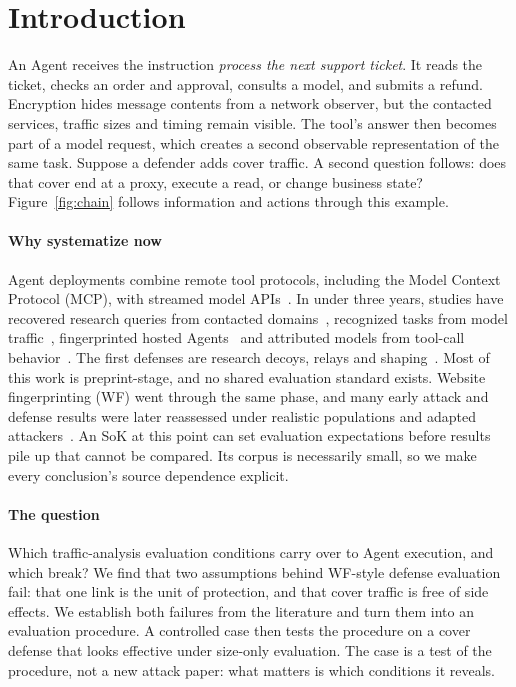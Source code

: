 \section{Introduction}
An Agent receives the instruction \emph{process the next support ticket}. It reads the ticket, checks an order and approval, consults a model, and submits a refund. Encryption hides message contents from a network observer, but the contacted services, traffic sizes and timing remain visible. The tool's answer then becomes part of a model request, which creates a second observable representation of the same task. Suppose a defender adds cover traffic. A second question follows: does that cover end at a proxy, execute a read, or change business state? Figure~\ref{fig:chain} follows information and actions through this example.



\paragraph{Why systematize now}
Agent deployments combine remote tool protocols, including the Model Context Protocol (MCP), with streamed model APIs~\cite{mcp2025transports,rfc9113}. In under three years, studies have recovered research queries from contacted domains~\cite{jeong2026wra}, recognized tasks from model traffic~\cite{li2026ant,pouryousef2026traffic}, fingerprinted hosted Agents~\cite{agentprint2025} and attributed models from tool-call behavior~\cite{zhao2026agenttrace,ediga2026trace}. The first defenses are research decoys, relays and shaping~\cite{jeong2026wra,dangol2026workflow}. Most of this work is preprint-stage, and no shared evaluation standard exists. Website fingerprinting (WF) went through the same phase, and many early attack and defense results were later reassessed under realistic populations and adapted attackers~\cite{dyer2012peekaboo,juarez2014critical,mathews2023critical}. An SoK at this point can set evaluation expectations before results pile up that cannot be compared. Its corpus is necessarily small, so we make every conclusion's source dependence explicit.

\paragraph{The question}
Which traffic-analysis evaluation conditions carry over to Agent execution, and which break? We find that two assumptions behind WF-style defense evaluation fail: that one link is the unit of protection, and that cover traffic is free of side effects. We establish both failures from the literature and turn them into an evaluation procedure. A controlled case then tests the procedure on a cover defense that looks effective under size-only evaluation. The case is a test of the procedure, not a new attack paper: what matters is which conditions it reveals.

